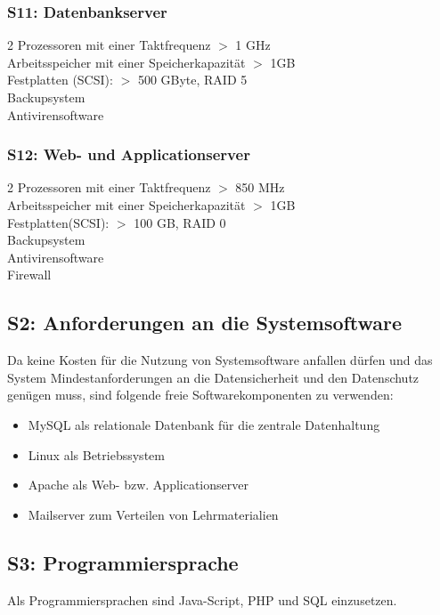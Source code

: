 \documentclass[10pt,a4paper]{scrartcl}
\begin{document}
\subsubsection*{S11: Datenbankserver}

2 Prozessoren mit einer Taktfrequenz $>$ 1 GHz\\
Arbeitsspeicher mit einer Speicherkapazität $>$ 1GB\\
Festplatten (SCSI): $>$ 500 GByte, RAID 5\\
Backupsystem\\
Antivirensoftware

\subsubsection*{S12: Web- und Applicationserver}

2 Prozessoren mit einer Taktfrequenz $>$ 850 MHz\\
Arbeitsspeicher mit einer Speicherkapazität $>$ 1GB\\
Festplatten(SCSI): $>$ 100 GB, RAID 0\\
Backupsystem\\
Antivirensoftware\\
Firewall

\subsection{S2: Anforderungen an die Systemsoftware}
Da keine Kosten für die Nutzung von Systemsoftware anfallen dürfen und das System Mindestanforderungen an die Datensicherheit und den Datenschutz genügen muss, sind folgende freie Softwarekomponenten zu verwenden:
\begin{itemize}
\item MySQL als relationale Datenbank für die zentrale Datenhaltung
\item Linux als Betriebssystem
\item Apache als Web- bzw. Applicationserver
\item Mailserver zum Verteilen von Lehrmaterialien
\end{itemize}

\subsection{S3: Programmiersprache}
Als Programmiersprachen sind Java-Script, PHP und SQL einzusetzen.
\end{document}
